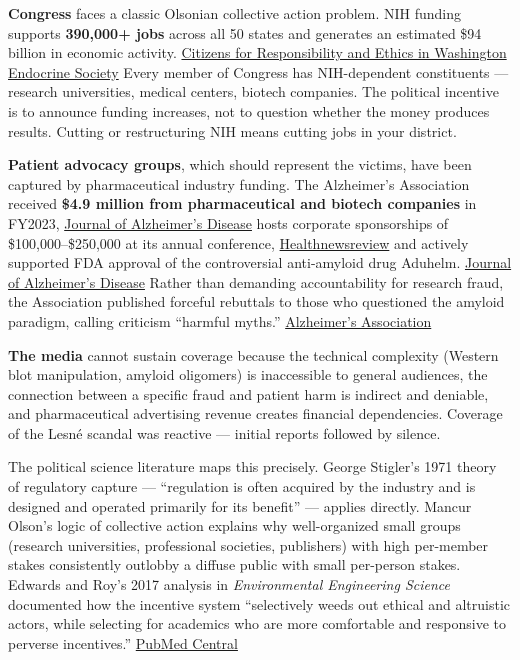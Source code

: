 \textbf{Congress} faces a classic Olsonian collective action problem. NIH funding supports \textbf{390,000+ jobs} across all 50 states and generates an estimated \$94 billion in economic activity. \href{https://www.citizensforethics.org/reports-investigations/crew-reports/doges-big-illusion-the-heavy-costs-of-the-trump-administrations-so-called-efficiency/}{Citizens for Responsibility and Ethics in Washington} \href{https://www.endocrine.org/advocacy/position-statements/biomedical-research-funding}{Endocrine Society} Every member of Congress has NIH-dependent constituents --- research universities, medical centers, biotech companies. The political incentive is to announce funding increases, not to question whether the money produces results. Cutting or restructuring NIH means cutting jobs in your district.

\textbf{Patient advocacy groups}, which should represent the victims, have been captured by pharmaceutical industry funding. The Alzheimer's Association received \textbf{\$4.9 million from pharmaceutical and biotech companies} in FY2023, \href{https://www.j-alz.com/content/time-look-upstream-and-hold-us-alzheimers-association-accountable-its-actions}{Journal of Alzheimer's Disease} hosts corporate sponsorships of \$100,000--\$250,000 at its annual conference, \href{https://www.healthnewsreview.org/2016/03/investigation-alzheimers-association-fighting-didnt-address-role-corporate-sponsorships/}{Healthnewsreview} and actively supported FDA approval of the controversial anti-amyloid drug Aduhelm. \href{https://www.j-alz.com/content/time-look-upstream-and-hold-us-alzheimers-association-accountable-its-actions}{Journal of Alzheimer's Disease} Rather than demanding accountability for research fraud, the Association published forceful rebuttals to those who questioned the amyloid paradigm, calling criticism ``harmful myths.'' \href{https://www.alz.org/news/2025/alzheimers-research-harmful-myths-must-stop}{Alzheimer's Association}

\textbf{The media} cannot sustain coverage because the technical complexity (Western blot manipulation, amyloid oligomers) is inaccessible to general audiences, the connection between a specific fraud and patient harm is indirect and deniable, and pharmaceutical advertising revenue creates financial dependencies. Coverage of the Lesné scandal was reactive --- initial reports followed by silence.

The political science literature maps this precisely. George Stigler's 1971 theory of regulatory capture --- ``regulation is often acquired by the industry and is designed and operated primarily for its benefit'' --- applies directly. Mancur Olson's logic of collective action explains why well-organized small groups (research universities, professional societies, publishers) with high per-member stakes consistently outlobby a diffuse public with small per-person stakes. Edwards and Roy's 2017 analysis in \emph{Environmental Engineering Science} documented how the incentive system ``selectively weeds out ethical and altruistic actors, while selecting for academics who are more comfortable and responsive to perverse incentives.'' \href{https://pmc.ncbi.nlm.nih.gov/articles/PMC8247552/}{PubMed Central}

